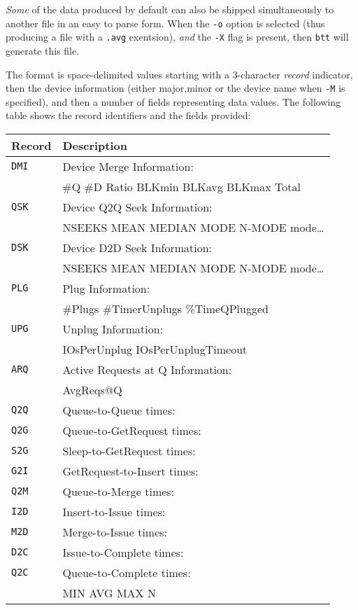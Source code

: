 \documentclass{article}
\begin{document}
  \emph{Some} of the data produced by default can also be shipped
  simultaneously to another file in an easy to parse form. When
  the \texttt{-o} option is selected (thus producing a file with a
  \texttt{.avg} exentsion), \emph{and} the \texttt{-X} flag is present,
  then \texttt{btt} will generate this file.

  The format is space-delimited values starting with a 3-character
  \emph{record} indicator, then the device information (either major,minor
  or the device name when \texttt{-M} is specified), and then a number of
  fields representing data values. The following table shows the record
  identifiers and the fields provided:

  \bigskip
  \begin{tabular}{|l|l|}\hline
  \textbf{Record} & \textbf{Description}\\\hline
  \texttt{DMI}	& Device Merge Information:\\
		& \#Q \#D Ratio BLKmin BLKavg BLKmax Total\\\hline
  \texttt{QSK}	& Device Q2Q Seek Information:\\
		& NSEEKS MEAN MEDIAN MODE N-MODE mode\ldots\\\hline
  \texttt{DSK}	& Device D2D Seek Information:\\
		& NSEEKS MEAN MEDIAN MODE N-MODE mode\ldots\\\hline
  \texttt{PLG}	& Plug Information:\\
		& \#Plugs \#TimerUnplugs \%TimeQPlugged\\\hline
  \texttt{UPG}	& Unplug Information:\\
		& IOsPerUnplug IOsPerUnplugTimeout\\\hline
  \texttt{ARQ}	& Active Requests at Q Information:\\
  		& AvgReqs@Q\\\hline\hline
  \texttt{Q2Q}  & Queue-to-Queue times:\\
  \texttt{Q2G}  & Queue-to-GetRequest times:\\
  \texttt{S2G}  & Sleep-to-GetRequest times:\\
  \texttt{G2I}  & GetRequest-to-Insert times:\\
  \texttt{Q2M}  & Queue-to-Merge times:\\
  \texttt{I2D}  & Insert-to-Issue times:\\
  \texttt{M2D}  & Merge-to-Issue times:\\
  \texttt{D2C}  & Issue-to-Complete times:\\
  \texttt{Q2C}  & Queue-to-Complete times:\\
                & MIN AVG MAX N\\\hline
  \end{tabular}
\end{document}
